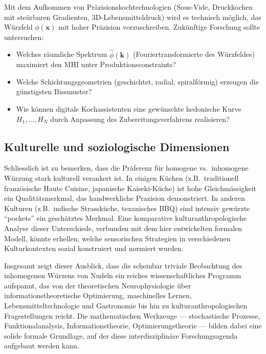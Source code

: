 ﻿\documentclass[12pt,a4paper]{article}
\theoremstyle{definition}
\newcommand{\bx}{\mathbf{x}}
\begin{document}
Mit dem Aufkommen von Präzisionskochtechnologien (Sous-Vide,
Druckkochen mit steürbaren Gradienten, 3D-Lebensmitteldruck) wird es
technisch möglich, das Würzfeld $\phi(\bx)$ mit hoher Präzision
vorzuschreiben. Zukünftige Forschung sollte untersuchen:
\begin{itemize}
  \item Welches räumliche Spektrum $\hat{\phi}(\mathbf{k})$ (Fouriertransformierte
    des Würzfeldes) maximiert den MHI unter Produktionsconstraints?
  \item Welche Schichtungsgeometrien (geschichtet, radial, spiralförmig)
    erzeugen die günstigsten Bissmuster?
  \item Wie können digitale Kochassistenten eine gewünschte hedonische
    Kurve $H_1, \ldots, H_N$ durch Anpassung des Zubereitungsverfahrens
    realisieren?
\end{itemize}

\subsection{Kulturelle und soziologische Dimensionen}

Schliesslich ist zu bemerken, dass die Präferenz für homogene vs.\
inhomogene Würzung stark kulturell verankert ist. In einigen Küchen
(z.B.\ traditionell französische Haute Cuisine, japanische
Kaiseki-Küche) ist hohe Gleichmässigkeit ein Qualitätsmerkmal, das
handwerkliche Prazision demonstriert. In anderen Kulturen (z.B.\ indische
Strassküche, texanisches BBQ) sind intensiv gewürzte ``pockets'' ein
geschätztes Merkmal. Eine komparative kulturanthropologische Analyse
dieser Unterschiede, verbunden mit dem hier entwickelten formalen Modell,
könnte erhellen, welche sensorischen Strategien in verschiedenen
Kulturkontexten sozial konstruiert und normiert wurden.

\bigskip

Insgesamt zeigt dieser Ausblick, dass die scheinbar triviale
Beobachtung des inhomogenen Würzens von Nudeln ein reiches
wissenschaftliches Programm aufspannt, das von der theoretischen
Neurophysiologie über informationstheoretische Optimierung, maschinelles
Lernen, Lebensmitteltechnologie und Gastronomie bis hin zu
kulturanthropologischen Fragestellungen reicht. Die mathematischen
Werkzeuge --- stochastische Prozesse, Funktionalanalysis,
Informationstheorie, Optimierungstheorie --- bilden dabei eine
solide formale Grundlage, auf der diese interdisziplinäre
Forschungsagenda aufgebaut werden kann.
\end{document}
